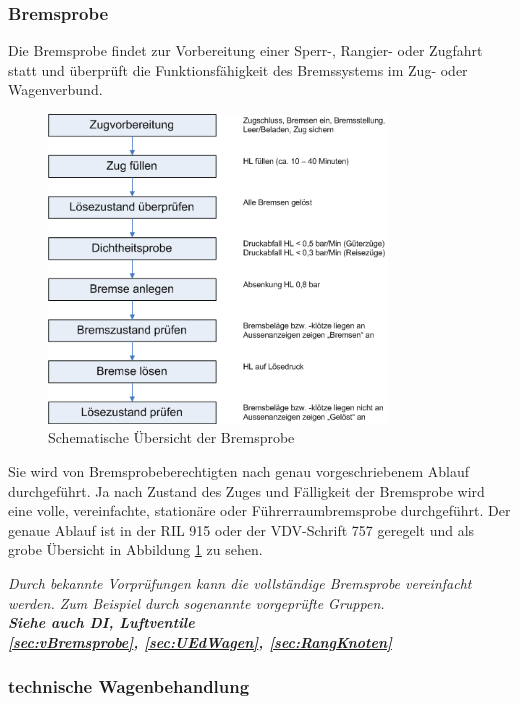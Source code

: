 \subsubsection{Bremsprobe}
Die \gls{Bremsprobe} findet zur Vorbereitung einer Sperr-, Rangier- oder Zugfahrt statt und überprüft die Funktionsfähigkeit des Bremssystems im Zug- oder Wagenverbund.\par
\begin{figure}[htbp] 
    \begin{center}
            \includegraphics[width=9cm]{Bilder/bremsprobe.png}
            \caption{Schematische Übersicht der Bremsprobe}
            \label{fig:Bremsprobe}
    \end{center}
\end{figure} 
Sie wird von Bremsprobeberechtigten nach genau vorgeschriebenem Ablauf durchgeführt. Ja nach Zustand des Zuges und Fälligkeit der \gls{Bremsprobe} wird eine volle, vereinfachte, stationäre oder Führerraumbremsprobe durchgeführt. Der genaue Ablauf ist in der \acrshort{RIL} 915 oder der VDV-Schrift 757 geregelt und als grobe Übersicht in Abbildung \ref{fig:Bremsprobe} zu sehen.\par
\textit{Durch bekannte Vorprüfungen kann die vollständige \gls{Bremsprobe} vereinfacht werden. Zum Beispiel durch sogenannte vorgeprüfte Gruppen.\\
\textbf{Siehe auch DI, Luftventile\\
\ref{sec:vBremsprobe}, \ref{sec:UEdWagen}, \ref{sec:RangKnoten}}}
\subsubsection{technische Wagenbehandlung}

